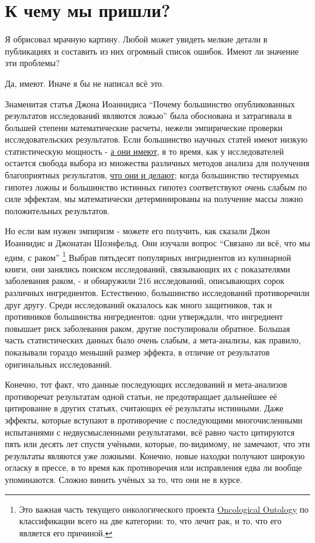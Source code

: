 \chapter{К чему мы пришли?}
\label{chp11}

Я обрисовал мрачную картину. Любой может увидеть мелкие детали в публикациях и составить из них огромный список ошибок. Имеют ли значение эти проблемы?

Да, имеют. Иначе я бы не написал всё это.

Знаменитая статья Джона Иоаннидиса ``Почему большинство опубликованных результатов исследований являются ложью''\cite{ioannidis_why_2005} была обоснована и затрагивала в большей степени математические расчеты, нежели эмпирические проверки исследовательских результатов. Если большинство научных статей имеют низкую статистическую мощность - \hyperref[chp3]{а они имеют}, в то время, как у исследователей остается свобода выбора из множества различных методов анализа для получения благоприятных результатов, \hyperref[chp8]{что они и делают}; когда большинство тестируемых гипотез ложны и большинство истинных гипотез соответствуют очень слабым по силе эффектам, мы математически детерминированы на получение массы ложно положительных результатов. 

Но если вам нужен эмпиризм - можете его получить, как сказали Джон Иоаннидис и Джонатан Шоэнфельд. Они изучали вопрос ``Связано ли всё, что мы едим, с раком'' \cite{schoenfeld_is_2013}\footnote{Это важная часть текущего онкологического проекта \href{http://dailymailoncology.tumblr.com/}{Oncological Ontology} по классификации всего на две категории: то, что лечит рак, и то, что его является его причиной.} Выбрав пятьдесят популярных ингридиентов из кулинарной книги, они занялись поиском исследований, связывающих их с показателями заболевания раком, - и обнаружили 216 исследований, описывающих сорок различных ингредиентов. Естественно, большинство исследований противоречили друг другу. Среди исследований оказалось как много защитников, так и противников большинства ингредиентов: одни утверждали, что ингредиент повышает риск заболевания раком, другие постулировали обратное. Большая часть статистических данных было очень слабым, а мета-анализы, как правило, показывали гораздо меньший размер эффекта, в отличие от результатов оригинальных исследований.


Конечно, тот факт, что данные последующих исследований и мета-анализов противоречат результатам одной статьи, не предотвращает дальнейшее её цитирование в других статьях, считающих её результаты истинными. Даже эффекты, которые вступают в противоречие с последующими многочисленными испытаниями с недвусмысленными результатами, всё равно часто цитируются пять или десять лет спустя учёными, которые, по-видимому, не замечают, что эти результаты являются уже ложными. \cite{tatsioni_persistence_2007} Конечно, новые находки получают широкую огласку в прессе, в то время как противоречия или исправления едва ли вообще упоминаются. \cite{gonon_why_2012} Сложно винить учёных за то, что они не в курсе.

